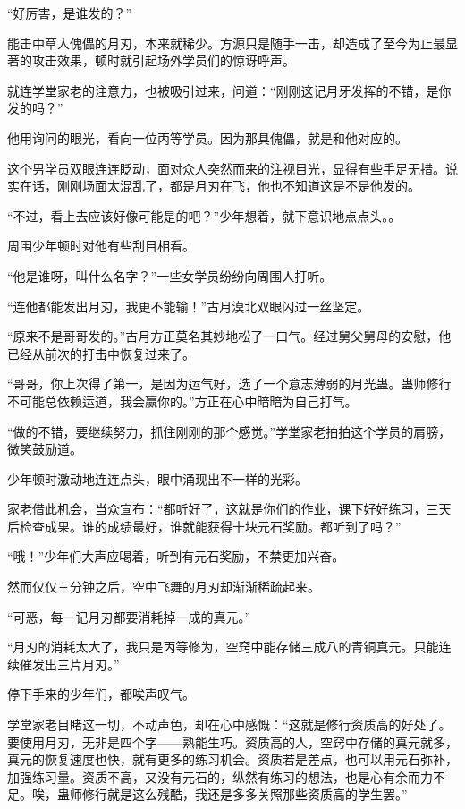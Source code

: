 \begin{this_body}
“好厉害，是谁发的？”

能击中草人傀儡的月刃，本来就稀少。方源只是随手一击，却造成了至今为止最显著的攻击效果，顿时就引起场外学员们的惊讶呼声。

就连学堂家老的注意力，也被吸引过来，问道：“刚刚这记月牙发挥的不错，是你发的吗？”

他用询问的眼光，看向一位丙等学员。因为那具傀儡，就是和他对应的。

这个男学员双眼连连眨动，面对众人突然而来的注视目光，显得有些手足无措。说实在话，刚刚场面太混乱了，都是月刃在飞，他也不知道这是不是他发的。

“不过，看上去应该好像可能是的吧？”少年想着，就下意识地点点头。。

周围少年顿时对他有些刮目相看。

“他是谁呀，叫什么名字？”一些女学员纷纷向周围人打听。

“连他都能发出月刃，我更不能输！”古月漠北双眼闪过一丝坚定。

“原来不是哥哥发的。”古月方正莫名其妙地松了一口气。经过舅父舅母的安慰，他已经从前次的打击中恢复过来了。

“哥哥，你上次得了第一，是因为运气好，选了一个意志薄弱的月光蛊。蛊师修行不可能总依赖运道，我会赢你的。”方正在心中暗暗为自己打气。

“做的不错，要继续努力，抓住刚刚的那个感觉。”学堂家老拍拍这个学员的肩膀，微笑鼓励道。

少年顿时激动地连连点头，眼中涌现出不一样的光彩。

家老借此机会，当众宣布：“都听好了，这就是你们的作业，课下好好练习，三天后检查成果。谁的成绩最好，谁就能获得十块元石奖励。都听到了吗？”

“哦！”少年们大声应喝着，听到有元石奖励，不禁更加兴奋。

然而仅仅三分钟之后，空中飞舞的月刃却渐渐稀疏起来。

“可恶，每一记月刃都要消耗掉一成的真元。”

“月刃的消耗太大了，我只是丙等修为，空窍中能存储三成八的青铜真元。只能连续催发出三片月刃。”

停下手来的少年们，都唉声叹气。

学堂家老目睹这一切，不动声色，却在心中感慨：“这就是修行资质高的好处了。要使用月刃，无非是四个字——熟能生巧。资质高的人，空窍中存储的真元就多，真元的恢复速度也快，就有更多的练习机会。资质若是差点，也可以用元石弥补，加强练习量。资质不高，又没有元石的，纵然有练习的想法，也是心有余而力不足。唉，蛊师修行就是这么残酷，我还是多多关照那些资质高的学生罢。”

\end{this_body}

